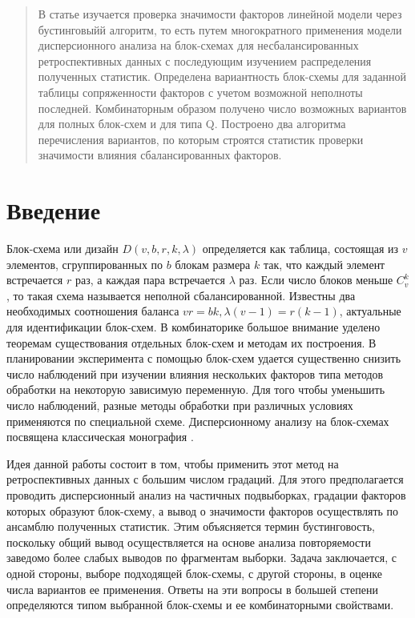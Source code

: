 \documentclass{math-mech-sci}
\begin{document}
\maketitle

\begin{abstract}
В статье изучается проверка значимости факторов линейной модели через бустинговыйй алгоритм, то есть путем многократного применения 
модели дисперсионного анализа на блок-схемах для  несбалансированных ретроспективных данных с последующим изучением распределения полученных статистик.  Определена вариантность  блок-схемы для заданной таблицы сопряженности факторов с учетом  возможной неполноты последней.  Комбинаторным образом получено число  возможных вариантов для полных блок-схем и для типа Q.    Построено два алгоритма  перечисления вариантов, по которым  строятся   статистик проверки значимости влияния сбалансированных факторов.    

\end{abstract}

\section{Введение}

Блок-схема или дизайн $D(v,b,r,k,\lambda)$  определяется как таблица, состоящая из $v$ элементов, сгруппированных по $b$ блокам размера  $k$ так, что каждый элемент встречается  $r$ раз, а каждая пара встречается  $\lambda$ раз. %
Если число блоков меньше $C_v^k$, то такая схема называется неполной сбалансированной. Известны два необходимых соотношения баланса $vr=bk, \lambda(v-1)=r(k-1)$, актуальные для идентификации блок-схем.  В  комбинаторике \cite{bib:holl1970}  большое внимание уделено теоремам существования отдельных блок-схем и методам их построения. В планировании эксперимента с  помощью блок-схем удается существенно снизить число наблюдений при изучении  влияния нескольких факторов типа методов обработки на некоторую  зависимую переменную.  Для того чтобы уменьшить число наблюдений,  разные методы обработки при различных  условиях применяются по специальной схеме.  Дисперсионному анализу на  блок-схемах  посвящена классическая  монография \cite{bib:duge1972}. 

Идея данной работы состоит в том, чтобы применить этот метод на ретроспективных данных с большим числом градаций. Для этого предполагается проводить дисперсионный анализ на частичных подвыборках, градации факторов которых образуют блок-схему,  а вывод о значимости факторов осуществлять  по  ансамблю полученных статистик.   
Этим  объясняется термин бустинговость, поскольку общий вывод осуществляется на основе анализа повторяемости заведомо более слабых выводов по фрагментам выборки. 
Задача заключается, с одной стороны, выборе подходящей блок-схемы, с другой стороны, в оценке числа вариантов ее применения. Ответы на эти вопросы в большей степени определяются типом выбранной блок-схемы  и ее комбинаторными свойствами. 
\end{document}
